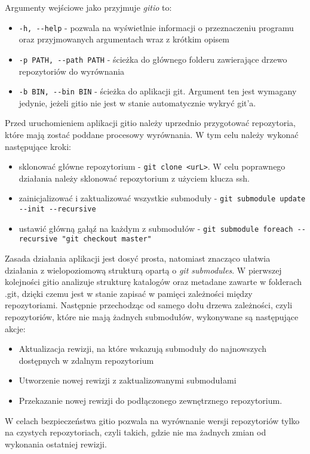 \clearpage
Argumenty wejściowe jako przyjmuje \emph{gitio} to:
\begin{itemize}
    \item \lstinline{-h, --help} - pozwala na wyświetlnie informacji o przeznaczeniu programu oraz przyjmowanych argumentach wraz z krótkim opisem
    \item \lstinline{-p PATH, --path PATH} - ścieżka do głównego folderu zawierające drzewo repozytoriów do wyrównania
    \item \lstinline{-b BIN, --bin BIN} - ścieżka do aplikacji git. Argument ten jest wymagany jedynie, jeżeli gitio nie jest w stanie automatycznie wykryć git'a.
\end{itemize}

Przed uruchomieniem aplikacji gitio należy uprzednio przygotować repozytoria, które mają zostać poddane procesowy wyrównania. W tym celu należy wykonać następujące kroki:
\begin{itemize}
    \item sklonować główne repozytorium - \lstinline{git clone <urL>}. W celu poprawnego działania należy sklonować repozytorium z użyciem klucza ssh.
    \item zainicjalizować i zaktualizować wszystkie submoduły - \lstinline{git submodule update --init --recursive}
    \item ustawić główną gałąź na każdym z submodułów - \lstinline{git submodule foreach --recursive "git checkout master"}
\end{itemize}
Zasada działania aplikacji jest dosyć prosta, natomiast znacząco ułatwia działania z wielopoziomową strukturą opartą o \emph{git submodules}. W pierwszej kolejności gitio analizuje strukturę katalogów oraz metadane zawarte w folderach .git, dzięki czemu jest w stanie zapisać w pamięci zależności między repozytoriami. Następnie przechodząc od samego dołu drzewa zależności, czyli repozytoriów, które nie mają żadnych submodułów, wykonywane są następujące akcje:
\begin{itemize}
    \item Aktualizacja rewizji, na które wskazują submoduły do najnowszych dostępnych w zdalnym repozytorium
    \item Utworzenie nowej rewizji z zaktualizowanymi submodułami
    \item Przekazanie nowej rewizji do podłączonego zewnętrznego repozytorium.
\end{itemize}
W celach bezpieczeństwa gitio pozwala na wyrównanie wersji repozytoriów tylko na czystych repozytoriach, czyli takich, gdzie nie ma żadnych zmian od wykonania ostatniej rewizji.

